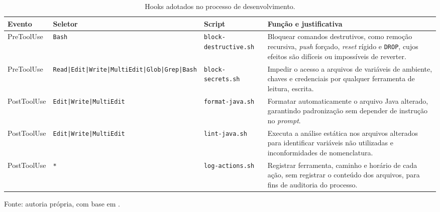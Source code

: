 \renewcommand{\arraystretch}{1.5}
\begin{table}[H]
    \centering
    \caption{Hooks adotados no processo de desenvolvimento.}
    \label{tab:hooks-propostos}
    \small

    \begin{tabularx}{\textwidth}{|>{\hsize=0.65\hsize\raggedright\arraybackslash}X|>{\hsize=0.85\hsize\raggedright\arraybackslash}X|>{\hsize=1.1\hsize\raggedright\arraybackslash}X|>{\hsize=1.4\hsize\raggedright\arraybackslash}X|}
        \hline
        \textbf{Evento} & \textbf{Seletor} & \textbf{Script} & \textbf{Função e justificativa} \\
        \hline
        PreToolUse & \texttt{Bash} & \texttt{block-\allowbreak destructive.sh} & Bloquear comandos destrutivos, como remoção recursiva, \textit{push} forçado, \textit{reset} rígido e \texttt{DROP}, cujos efeitos são difíceis ou impossíveis de reverter. \\
        \hline
        PreToolUse & \texttt{Read|\allowbreak Edit|\allowbreak Write|\allowbreak MultiEdit|\allowbreak Glob|\allowbreak Grep|\allowbreak Bash} & \texttt{block-\allowbreak secrets.sh} & Impedir o acesso a arquivos de variáveis de ambiente, chaves e credenciais por qualquer ferramenta de leitura, escrita. \\
        \hline
        PostToolUse & \texttt{Edit|\allowbreak Write|\allowbreak MultiEdit} & \texttt{format-\allowbreak java.sh} & Formatar automaticamente o arquivo Java alterado, garantindo padronização sem depender de instrução no \textit{prompt}. \\
        \hline
        PostToolUse & \texttt{Edit|\allowbreak Write|\allowbreak MultiEdit} & \texttt{lint-\allowbreak java.sh} & Executa a análise estática nos arquivos alterados para identificar variáveis não utilizadas e inconformidades de nomenclatura. \\
        \hline
        PostToolUse & \texttt{*} & \texttt{log-\allowbreak actions.sh} & Registrar ferramenta, caminho e horário de cada ação, sem registrar o conteúdo dos arquivos, para fins de auditoria do processo. \\
        \hline
    \end{tabularx}

    \vspace{0.5em}
    \small Fonte: autoria própria, com base em .
\end{table}


